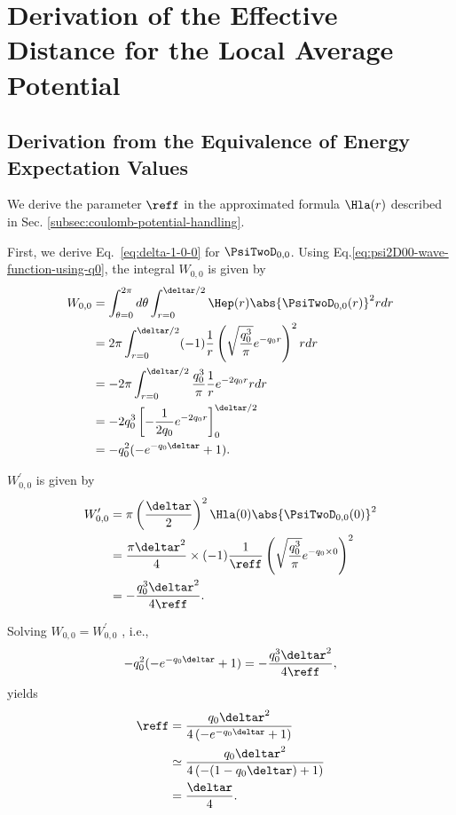 \documentclass[manuscript_main.tex]{subfiles}
\begin{document}
\appendix
\section{Derivation of the Effective Distance for the Local Average Potential}
\label{chap:appendix_derivation_derivation}
\subsection{Derivation from the Equivalence of Energy Expectation Values}
We derive the parameter $\reff$ in the approximated formula
$\Hla(r)$ described in Sec. \ref{subsec:coulomb-potential-handling}.

First, we derive Eq.~\eqref{eq:delta-1-0-0} for $\PsiTwoD_{0,0}$.
Using Eq.\eqref{eq:psi2D00-wave-function-using-q0}, the integral $W_{0,0}$ is given by
\begin{align}
  W_{0,0}
   &= \int_{\theta=0}^{2\pi}d\theta
      \int_{r=0}^{\deltar/2}
      \Hep(r)\abs{\PsiTwoD_{0,0}(r)}^2r dr\notag\\
   &= 2\pi \int_{r=0}^{\deltar/2}
      (-1)\frac{1}{r} \left(\sqrt{\frac{q_0^3}{\pi}}e^{-q_0 r}\right)^2 r dr \notag\\
   &= -2\pi\int_{r=0}^{\deltar/2}\frac{q_0^3}{\pi}\frac{1}{r}e^{-2q_0r} r dr \notag\\
   &= -2q_0^3 \left[-\frac{1}{2q_0}e^{-2q_0r}\right]_{0}^{\deltar/2}\notag\\
   &=-q_0^2(-e^{-q_0\deltar}+1) .
\end{align}

$W_{0,0}^\prime$ is given by
\begin{align}
    W_{0,0}^\prime
    &=\pi\left(\frac{\deltar}{2}\right)^2 \Hla(0)\abs{\PsiTwoD_{0,0}(0)}^2\notag\\
    &=\frac{\pi\deltar^2}{4}\times(-1)\frac{1}{\reff} \left(\sqrt{\frac{q_0^3}{\pi}}e^{-q_0\times0}\right)^2 \notag\\
    &= -\frac{q_0^3\deltar^2}{4\reff} .
\end{align}

Solving $W_{0,0}=W_{0,0}^\prime$ , i.e., 
\begin{equation}
  -q_0^2(-e^{-q_0\deltar}+1) = -\frac{q_0^3\deltar^2}{4\reff},
\end{equation}
yields
\begin{align}
\reff &= \frac{q_0\deltar^2}{4\left(-e^{-q_0\deltar}+1\right)}\notag\\
      &\simeq \frac{q_0 \deltar^2}{4\left(-(1-q_0\deltar)+1\right)}\notag\\
&=\frac{\deltar}{4} .
\end{align}
\end{document}
